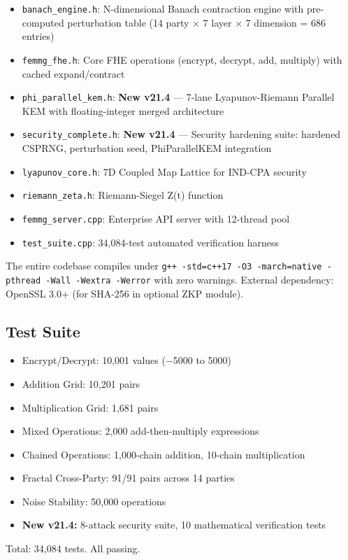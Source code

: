 \documentclass[11pt,a4paper]{article}
\begin{document}
\begin{itemize}
\item \texttt{banach\_engine.h}: N-dimensional Banach contraction engine with pre-computed perturbation table (14 party $\times$ 7 layer $\times$ 7 dimension = 686 entries)
\item \texttt{femmg\_fhe.h}: Core FHE operations (encrypt, decrypt, add, multiply) with cached expand/contract
\item \texttt{phi\_parallel\_kem.h}: \textbf{New v21.4} — 7-lane Lyapunov-Riemann Parallel KEM with floating-integer merged architecture
\item \texttt{security\_complete.h}: \textbf{New v21.4} — Security hardening suite: hardened CSPRNG, perturbation seed, PhiParallelKEM integration
\item \texttt{lyapunov\_core.h}: 7D Coupled Map Lattice for IND-CPA security
\item \texttt{riemann\_zeta.h}: Riemann-Siegel Z(t) function
\item \texttt{femmg\_server.cpp}: Enterprise API server with 12-thread pool
\item \texttt{test\_suite.cpp}: 34,084-test automated verification harness
\end{itemize}

The entire codebase compiles under \texttt{g++ -std=c++17 -O3 -march=native -pthread -Wall -Wextra -Werror} with zero warnings. External dependency: OpenSSL 3.0+ (for SHA-256 in optional ZKP module).

\subsection{Test Suite}
\begin{itemize}
\item Encrypt/Decrypt: 10,001 values ($-$5000 to 5000)
\item Addition Grid: 10,201 pairs
\item Multiplication Grid: 1,681 pairs
\item Mixed Operations: 2,000 add-then-multiply expressions
\item Chained Operations: 1,000-chain addition, 10-chain multiplication
\item Fractal Cross-Party: 91/91 pairs across 14 parties
\item Noise Stability: 50,000 operations
\item \textbf{New v21.4:} 8-attack security suite, 10 mathematical verification tests
\end{itemize}
Total: 34,084 tests. All passing.
\end{document}
